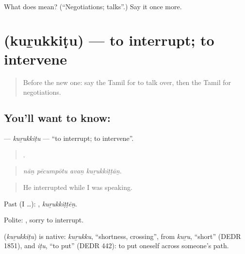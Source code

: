 \begin{tcolorbox}[breakable,colback=teal!4,colframe=teal!35!black,title={Before you move on}]
What does  mean? (\textquotedblleft{}Negotiations; talks\textquotedblright{}.) Say it once more.
\end{tcolorbox}
\section[\texorpdfstring{\ta{குறுக்கிடு} (kuṟukkiṭu)}{குறுக்கிடு (kuṟukkiṭu)}]{ (kuṟukkiṭu) — to interrupt; to intervene}

\label{lesson:TA-C356-kurukkitu}



\begin{quote}
Before the new one: say the Tamil for to talk over, then the Tamil for negotiations.
\end{quote}

\subsection*{You'll want to know: }
\textbf{} — \emph{kuṟukkiṭu} — \textquotedblleft{}to interrupt; to intervene\textquotedblright{}.

\begin{quote}
   .
\end{quote}

\begin{quote}
\emph{nāṉ pēcumpōtu avaṉ kuṟukkiṭṭāṉ.}
\end{quote}

\begin{quote}
He interrupted while I was speaking.
\end{quote}

Past (I …): , \emph{kuṟukkiṭṭēṉ}.

Polite:  , sorry to interrupt.

\begin{cousinweb}
\textbf{} (\emph{kuṟukkiṭu}) is native: \emph{kuṟukku}, \textquotedblleft{}shortness, crossing\textquotedblright{}, from \emph{kuṟu}, \textquotedblleft{}short\textquotedblright{} (DEDR 1851), and \emph{iṭu}, \textquotedblleft{}to put\textquotedblright{} (DEDR 442): to put oneself across someone's path.
\end{cousinweb}

